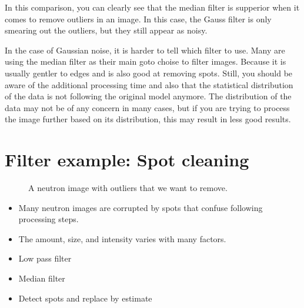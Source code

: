 \documentclass[letterpaper,10pt,english]{sphinxmanual}
\begin{document}
\noindent{}

\sphinxAtStartPar
In this comparison, you can clearly see that the median filter is supperior when it comes to remove outliers in an image. In this case, the Gauss filter is only smearing out the outliers, but they still appear as noisy.

\sphinxAtStartPar
In the case of Gaussian noise, it is harder to tell which filter to use. Many are using the median filter as their main goto choise to filter images. Because it is usually gentler to edges and is also good at removing spots. Still, you should be aware of the additional processing time and also that the statistical distribution of the data is not following the original model anymore. The distribution of the data may not be of any concern in many cases, but if you are trying to process the image further based on its distribution, this may result in less good results.


\section{Filter example: Spot cleaning}
\label{\detokenize{02-ImageEnhancement:filter-example-spot-cleaning}}
\begin{figure}[htbp]
\centering
\capstart

\noindent{}
\caption{A neutron image with outliers that we want to remove.}\label{\detokenize{02-ImageEnhancement:id11}}\end{figure}


\begin{itemize}
\item {} 
\sphinxAtStartPar
Many neutron images are corrupted by spots that confuse following processing steps.

\item {} 
\sphinxAtStartPar
The amount, size, and intensity varies with many factors.

\end{itemize}


\begin{itemize}
\item {} 
\sphinxAtStartPar
Low pass filter

\item {} 
\sphinxAtStartPar
Median filter

\item {} 
\sphinxAtStartPar
Detect spots and replace by estimate

\end{itemize}
\end{document}
